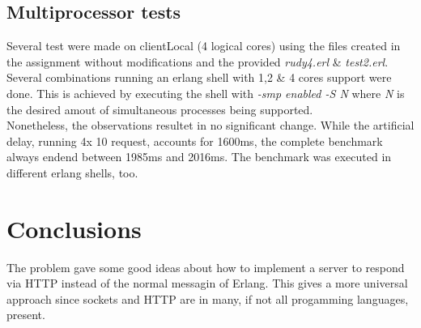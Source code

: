 \documentclass[a4paper, 11pt]{article}
\begin{document}
\subsection{Multiprocessor tests}
Several test were made on clientLocal (4 logical cores) using the files created in the assignment without modifications and the provided \textit{rudy4.erl} \& \textit{test2.erl}.
Several combinations running an erlang shell with 1,2 \& 4 cores support were done. This is achieved by executing the shell with \textit{-smp enabled -S N} where \textit{N} is the desired amout of simultaneous processes being supported.
\\Nonetheless, the observations resultet in no significant change.
While the artificial delay, running 4x 10 request, accounts for 1600ms, the complete benchmark always endend between 1985ms and 2016ms.
The benchmark was executed in different erlang shells, too.

\section{Conclusions}

The problem gave some good ideas about how to implement a server to respond via HTTP instead of the normal messagin of Erlang. This gives a more universal approach since sockets and HTTP are in many, if not all progamming languages, present.
\end{document}
